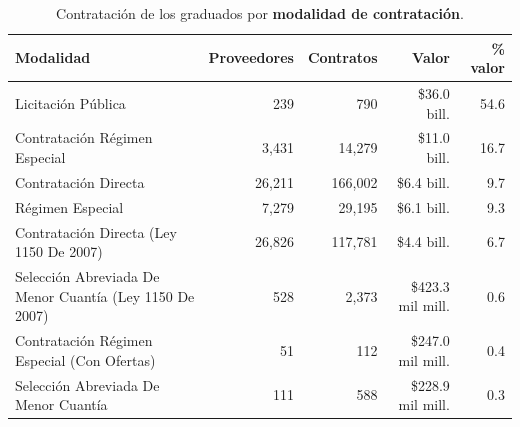 \begin{table}[H]\centering\footnotesize
\caption{Contratación de los graduados por \textbf{modalidad de contratación}.}\label{tab:secop_modalidad}
\begin{tabular}{lrrrr}
\toprule
\rowcolor{ustaazul}\textbf{\color{white}Modalidad} & \textbf{\color{white}Proveedores} & \textbf{\color{white}Contratos} & \textbf{\color{white}Valor} & \textbf{\color{white}\% valor} \\
\midrule
Licitación Pública & 239 & 790 & \$36.0 bill. & 54.6 \\
Contratación Régimen Especial & 3,431 & 14,279 & \$11.0 bill. & 16.7 \\
Contratación Directa & 26,211 & 166,002 & \$6.4 bill. & 9.7 \\
Régimen Especial & 7,279 & 29,195 & \$6.1 bill. & 9.3 \\
Contratación Directa (Ley 1150 De 2007) & 26,826 & 117,781 & \$4.4 bill. & 6.7 \\
Selección Abreviada De Menor Cuantía (Ley 1150 De 2007) & 528 & 2,373 & \$423.3 mil mill. & 0.6 \\
Contratación Régimen Especial (Con Ofertas) & 51 & 112 & \$247.0 mil mill. & 0.4 \\
Selección Abreviada De Menor Cuantía & 111 & 588 & \$228.9 mil mill. & 0.3 \\
\bottomrule
\end{tabular}
\end{table}
